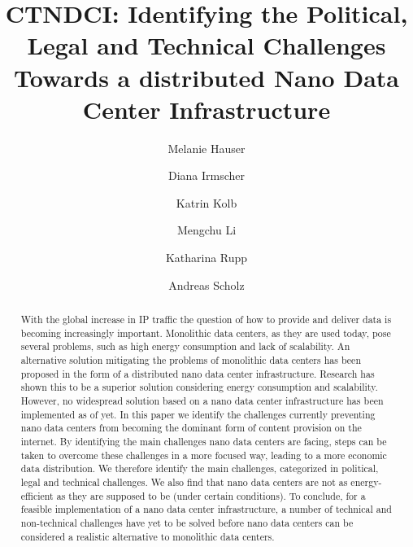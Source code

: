 \documentclass[review=true, screen, acmlarge]{acmart}
\begin{document}
\title{CTNDCI:  Identifying the Political, Legal and Technical Challenges Towards a distributed Nano Data Center Infrastructure} 

\author{Melanie Hauser}

\author{Diana Irmscher}

\author{Katrin Kolb}

\author{Mengchu Li} 

\author{Katharina Rupp}

\author{Andreas Scholz}




\begin{abstract}
With the global increase in IP traffic the question of how to provide and deliver data is becoming increasingly important. Monolithic data centers, as they are used today, pose several problems, such as high energy consumption and lack of scalability.
An alternative solution mitigating the problems of monolithic data centers has been proposed in the form of a distributed nano data center infrastructure. Research has shown this to be a superior solution considering energy consumption and scalability. 
However, no widespread solution based on a nano data center infrastructure has been implemented as of yet. In this paper we identify the challenges currently preventing nano data centers from becoming the dominant form of content provision on the internet.
By identifying the main challenges nano data centers are facing, steps can be taken to overcome these challenges in a more focused way, leading to a more economic data distribution.
We therefore identify the main challenges, categorized in political, legal and technical challenges.
We also find that nano data centers are not as energy-efficient as they are supposed to be (under certain conditions).
To conclude, for a feasible implementation of a nano data center infrastructure, a number of technical and non-technical challenges have yet to be solved before nano data centers can be considered a realistic alternative to monolithic data centers.




\end{abstract}
\end{document}
